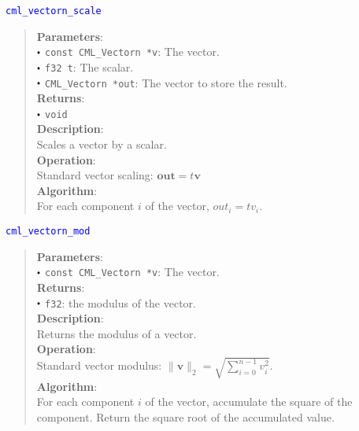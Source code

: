 \documentclass[a4paper,oneside,8pt]{extarticle}
\newcommand{\function}[1]{
  \noindent\textcolor{blue}{\texttt{#1}}
  \vspace{-0.3em}
}
\renewcommand{\dot}{\raisebox{0.3ex}{\scalebox{0.6}{$\bullet$}}}
\theoremstyle{definition}
\begin{document}
\function{cml\_vectorn\_scale}
\begin{quote}
  \textbf{Parameters}: \\
  $\dot$ \texttt{const CML\_Vectorn *v}: The vector. \\
  $\dot$ \texttt{f32 t}: The scalar. \\
  $\dot$ \texttt{CML\_Vectorn *out}: The vector to store the result. \\
  \textbf{Returns}: \\
  $\dot$ \texttt{void} \\

  \vspace{-0.75em}
  \textbf{Description}: \\
  Scales a vector by a scalar. \\

  \vspace{-0.75em}
  \textbf{Operation}: \\
  Standard vector scaling: $\mathbf{out} = t\mathbf{v}$ \\

  \vspace{-0.75em}
  \textbf{Algorithm}: \\
  For each component $i$ of the vector, $out_i = tv_i$. \\
\end{quote}

\function{cml\_vectorn\_mod}
\begin{quote}
  \textbf{Parameters}: \\
  $\dot$ \texttt{const CML\_Vectorn *v}: The vector. \\
  \textbf{Returns}: \\
  $\dot$ \texttt{f32}: the modulus of the vector. \\

  \vspace{-0.75em}
  \textbf{Description}: \\
  Returns the modulus of a vector. \\

  \vspace{-0.75em}
  \textbf{Operation}: \\
  Standard vector modulus: $\lVert\mathbf{v}\rVert_2 = \sqrt{\sum_{i=0}^{n-1} v_i^2}$. \\

  \vspace{-0.75em}
  \textbf{Algorithm}: \\
  For each component $i$ of the vector, accumulate the square of the component. Return the square root of the accumulated value. \\
\end{quote}
\end{document}
